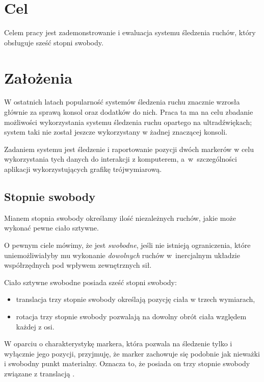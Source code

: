 \label{ch:cele}
\section{Cel}
Celem pracy jest zademonstrowanie i ewaluacja systemu śledzenia ruchów, który obsługuje sześć stopni swobody.

\section{Założenia}
W ostatnich latach popularność systemów śledzenia ruchu znacznie wzrosła głównie za sprawą konsol oraz dodatków do nich. Praca ta ma na celu zbadanie możliwości wykorzystania systemu śledzenia ruchu opartego na ultradźwiękach; system taki nie został jeszcze wykorzystany w żadnej znaczącej konsoli.

Zadaniem systemu jest śledzenie i raportowanie pozycji dwóch markerów w celu wykorzystania tych danych do interakcji z komputerem, a~w~szczególności aplikacji wykorzystujących grafikę trójwymiarową.

\subsection{Stopnie swobody}
Mianem stopnia swobody określamy ilość niezależnych ruchów, jakie może wykonać pewne ciało sztywne.

O pewnym ciele mówimy, że jest \textsl{swobodne}, jeśli nie istnieją ograniczenia, które uniemożliwiałyby mu wykonanie \textsl{dowolnych} ruchów w~inercjalnym układzie współrzędnych pod wpływem zewnętrznych sił.

Ciało sztywne swobodne posiada sześć stopni swobody:
\begin{itemize}
 \item translacja \ppauza trzy stopnie swobody określają pozycję ciała w trzech wymiarach,
 \item rotacja \ppauza trzy stopnie swobody pozwalają na dowolny obrót ciała względem każdej z osi.
\end{itemize}

W oparciu o charakterystykę markera, która pozwala na śledzenie tylko i wyłącznie jego pozycji, przyjmuję, że marker zachowuje się podobnie jak nieważki i swobodny punkt materialny. Oznacza to, że posiada on trzy stopnie swobody związane z translacją \citep{WrZa76}.

